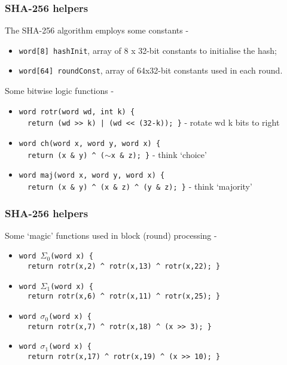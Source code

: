 \documentclass[10pt, hyperref={pdfpagelabels=false}]{beamer}
\begin{document}
\begin{frame}
\frametitle{SHA-256 helpers}
The SHA-256 algorithm employs some constants -
\begin{itemize}
\item \texttt{\color{brown}word[8] hashInit}, array of 8 x 32-bit constants to initialise the hash;
\item \texttt{\color{brown}word[64] roundConst}, array of 64x32-bit constants used in each round.
\end{itemize}

Some bitwise logic functions -
\begin{itemize}
\item \texttt{\color{brown}word rotr(word wd, int k) \{\\~~return (wd >> k) | (wd << (32-k)); \}} - rotate wd k bits to right
\item \texttt{\color{brown}word ch(word x, word y, word x) \{\\~~return (x \& y) \^{} ($\sim$x \& z); \}} - think `choice'
\item \texttt{\color{brown}word maj(word x, word y, word x) \{\\~~return (x \& y) \^{} (x \& z) \^{} (y \& z); \}} - think `majority' 
\end{itemize}
\end{frame}

\begin{frame}
\frametitle{SHA-256 helpers}
Some `magic' functions used in block (round) processing -
\begin{itemize}
\item \texttt{\color{brown}word $\Sigma_0$(word x) \{\\~~return rotr(x,2) \^{} rotr(x,13) \^{} rotr(x,22); \}} 
\item \texttt{\color{brown}word $\Sigma_1$(word x) \{\\~~return rotr(x,6) \^{} rotr(x,11) \^{} rotr(x,25); \}} 
\item \texttt{\color{brown}word $\sigma_0$(word x) \{\\~~return rotr(x,7) \^{} rotr(x,18) \^{} (x >> 3); \}} 
\item \texttt{\color{brown}word $\sigma_1$(word x) \{\\~~return rotr(x,17) \^{} rotr(x,19) \^{} (x >> 10); \}} 
\end{itemize}
\end{frame}
\end{document}
